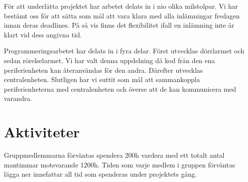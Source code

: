 \documentclass[a4paper]{article}
\begin{document}
För att underlätta projektet har arbetet delats in i nio olika milstolpar. Vi har bestämt oss för att sätta som mål att vara klara med alla inlämningar fredagen innan deras deadlines. På så vis finns det flexibilitet ifall en inlämning inte är klart vid dess angivna tid.

Programmeringsarbetet har delats in i fyra delar. Först utvecklas dörrlarmet och sedan rörelselarmet. Vi har valt denna uppdelning då kod från den ena periferienheten kan återanvändas för den andra. Därefter utvecklas centralenheten. Slutligen har vi suttit som mål att sammankoppla periferienheterna med centralenheten och överse att de kan kommunicera med varandra.

\section{Aktiviteter}

Gruppmedlemmarna förväntas spendera 200h vardera med ett totalt antal mantimmar motsvarande 1200h. Tiden som varje medlem i gruppen förväntas lägga ner innefattar all tid som spenderas under projektets gång.
\end{document}

